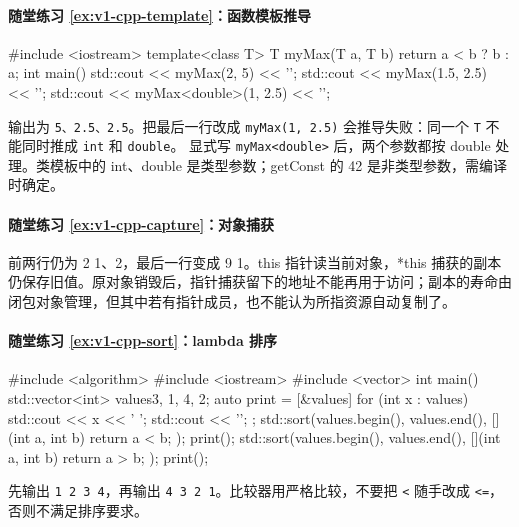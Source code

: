 \paragraph*{随堂练习 \ref{ex:v1-cpp-template}：函数模板推导}
\begin{solution}
\begin{tcpp}
#include <iostream>
template<class T>
T myMax(T a, T b) {
    return a < b ? b : a;
}
int main() {
    std::cout << myMax(2, 5) << '\n';
    std::cout << myMax(1.5, 2.5) << '\n';
    std::cout << myMax<double>(1, 2.5) << '\n';
}
\end{tcpp}
输出为 \texttt{5、2.5、2.5}。把最后一行改成 \texttt{myMax(1, 2.5)} 会推导失败：同一个 \texttt{T} 不能同时推成 \texttt{int} 和 \texttt{double}。
显式写 \texttt{myMax<double>} 后，两个参数都按 double 处理。类模板中的 int、double 是类型参数；getConst 的 42 是非类型参数，需编译时确定。
\end{solution}

\paragraph*{随堂练习 \ref{ex:v1-cpp-capture}：对象捕获}
\begin{solution}
前两行仍为 2 1、2，最后一行变成 9 1。this 指针读当前对象，*this 捕获的副本仍保存旧值。原对象销毁后，指针捕获留下的地址不能再用于访问；副本的寿命由闭包对象管理，但其中若有指针成员，也不能认为所指资源自动复制了。
\end{solution}
\paragraph*{随堂练习 \ref{ex:v1-cpp-sort}：lambda 排序}
\begin{solution}
\begin{tcpp}
#include <algorithm>
#include <iostream>
#include <vector>
int main() {
    std::vector<int> values{3, 1, 4, 2};
    auto print = [&values] {
        for (int x : values) std::cout << x << ' ';
        std::cout << '\n';
    };
    std::sort(values.begin(), values.end(),
              [](int a, int b) { return a < b; });
    print();
    std::sort(values.begin(), values.end(),
              [](int a, int b) { return a > b; });
    print();
}
\end{tcpp}
先输出 \texttt{1 2 3 4}，再输出 \texttt{4 3 2 1}。比较器用严格比较，不要把 \texttt{<} 随手改成 \texttt{<=}，否则不满足排序要求。
\end{solution}


